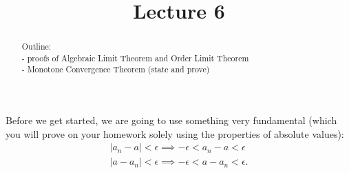 \documentclass{ximera}
\begin{document}
    \title{Lecture 6}
    
    \begin{abstract}  
    Outline: \\
    - proofs of Algebraic Limit Theorem and Order Limit Theorem\\
    - Monotone Convergence Theorem (state and prove)
\end{abstract}

\maketitle

Before we get started, we are going to use something very fundamental (which you will prove on your homework solely using the properties of absolute values):
\begin{align}
    |a_n-a| < \epsilon \implies -\epsilon < a_n-a< \epsilon 
\\
    |a-a_n| < \epsilon \implies -\epsilon < a-a_n< \epsilon.
\end{align}

\end{document}
